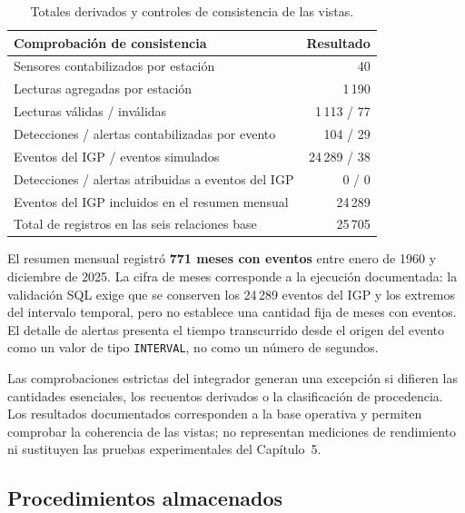 \documentclass[12pt,a4paper]{article}
\begin{document}
\begin{table}[H]
\centering\small
\begin{tabular}{>{\raggedright\arraybackslash}p{11.3cm}r}
\toprule
\textbf{Comprobación de consistencia} & \textbf{Resultado} \\
\midrule
Sensores contabilizados por estación & 40 \\
Lecturas agregadas por estación & 1\,190 \\
Lecturas válidas / inválidas & 1\,113 / 77 \\
Detecciones / alertas contabilizadas por evento & 104 / 29 \\
Eventos del IGP / eventos simulados & 24\,289 / 38 \\
Detecciones / alertas atribuidas a eventos del IGP & 0 / 0 \\
Eventos del IGP incluidos en el resumen mensual & 24\,289 \\
Total de registros en las seis relaciones base & 25\,705 \\
\bottomrule
\end{tabular}
\caption{Totales derivados y controles de consistencia de las vistas.}
\label{tab:controles-vistas-44}
\end{table}

El resumen mensual registró \textbf{771 meses con eventos} entre enero
de 1960 y diciembre de 2025. La cifra de meses corresponde a la ejecución
documentada: la validación SQL exige que se conserven los 24\,289 eventos
del IGP y los extremos del intervalo temporal, pero no establece una
cantidad fija de meses con eventos. El detalle de alertas presenta el
tiempo transcurrido desde el origen del evento como un valor de tipo
\texttt{INTERVAL}, no como un número de segundos.

Las comprobaciones estrictas del integrador generan una excepción
si difieren las cantidades esenciales, los recuentos derivados o la
clasificación de procedencia. Los resultados documentados corresponden
a la base operativa y permiten comprobar la coherencia de las vistas;
no representan mediciones de rendimiento ni sustituyen las pruebas
experimentales del Capítulo~5.



\subsection{Procedimientos almacenados}
\label{sec:procedimientos-almacenados}
\end{document}

